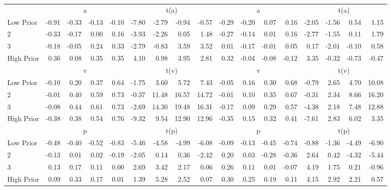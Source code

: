 \begin{table}[!ht]
\begin{tabular}{lrrrrrrrrrrrrrrrr}
     & \multicolumn{4}{c}{a} & \multicolumn{4}{c}{t(a)}  & \multicolumn{4}{c}{a} & \multicolumn{4}{c}{t(a)}   \\
     \cmidrule(r){2-5} \cmidrule(r){6-9}  \cmidrule(r){10-13} \cmidrule(r){14-17} 
    Low Prior  & -0.91  & -0.33  & -0.13  & -0.10  & -7.80  & -2.79  & -0.94  & -0.57  & -0.29  & -0.20  & 0.07  & 0.16  & -2.05  & -1.56  & 0.54  & 1.15   \\
    2  & -0.33  & -0.17  & 0.00  & 0.16  & -3.93  & -2.26  & 0.05  & 1.48  & -0.27  & -0.14  & 0.01  & 0.16  & -2.77  & -1.55  & 0.11  & 1.79   \\
    3  & -0.18  & -0.05  & 0.24  & 0.33  & -2.79  & -0.83  & 3.59  & 3.52  & 0.01  & -0.17  & -0.01  & 0.05  & 0.17  & -2.01  & -0.10  & 0.58   \\
    High Prior  & 0.36  & 0.08  & 0.35  & 0.35  & 4.10  & 0.98  & 3.95  & 2.81  & 0.32  & -0.04  & -0.08  & -0.12  & 3.35  & -0.32  & -0.73  & -0.47   \\
    
  
     & \multicolumn{4}{c}{v} & \multicolumn{4}{c}{t(v)}  & \multicolumn{4}{c}{v} & \multicolumn{4}{c}{t(v)}   \\
     \cmidrule(r){2-5} \cmidrule(r){6-9}  \cmidrule(r){10-13} \cmidrule(r){14-17} 
    Low Prior  & -0.10  & 0.20  & 0.37  & 0.64  & -1.75  & 3.60  & 5.72  & 7.43  & -0.05  & 0.16  & 0.30  & 0.68  & -0.79  & 2.65  & 4.70  & 10.08   \\
    2  & -0.01  & 0.40  & 0.59  & 0.73  & -0.37  & 11.48  & 16.57  & 14.72  & -0.01  & 0.10  & 0.35  & 0.67  & -0.31  & 2.34  & 8.66  & 16.20   \\
    3  & -0.08  & 0.44  & 0.61  & 0.73  & -2.69  & 14.30  & 19.48  & 16.31  & -0.17  & 0.09  & 0.29  & 0.57  & -4.38  & 2.18  & 7.48  & 12.88   \\
    High Prior  & -0.38  & 0.38  & 0.54  & 0.76  & -9.32  & 9.54  & 12.90  & 12.96  & -0.35  & 0.15  & 0.32  & 0.41  & -7.61  & 2.83  & 6.02  & 3.35   \\
    
  
     & \multicolumn{4}{c}{p} & \multicolumn{4}{c}{t(p)}  & \multicolumn{4}{c}{p} & \multicolumn{4}{c}{t(p)}   \\
     \cmidrule(r){2-5} \cmidrule(r){6-9}  \cmidrule(r){10-13} \cmidrule(r){14-17} 
    Low Prior  & -0.48  & -0.40  & -0.52  & -0.83  & -5.46  & -4.58  & -4.99  & -6.08  & -0.09  & -0.13  & -0.45  & -0.74  & -0.88  & -1.36  & -4.49  & -6.90   \\
    2  & -0.13  & 0.01  & 0.02  & -0.19  & -2.05  & 0.14  & 0.36  & -2.42  & 0.20  & 0.03  & -0.28  & -0.36  & 2.64  & 0.42  & -4.32  & -5.44   \\
    3  & 0.13  & 0.17  & 0.11  & 0.00  & 2.69  & 3.42  & 2.17  & 0.06  & 0.26  & 0.11  & 0.01  & -0.07  & 4.19  & 1.75  & 0.21  & -0.96   \\
    High Prior  & 0.09  & 0.33  & 0.17  & 0.01  & 1.39  & 5.28  & 2.52  & 0.07  & 0.30  & 0.25  & 0.19  & 0.11  & 4.15  & 2.92  & 2.21  & 0.57   \\
    

\end{tabular}
\end{table}
